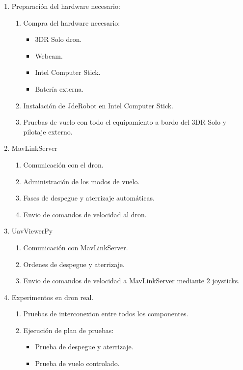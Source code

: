 \begin{enumerate}
\item Preparación del hardware necesario:
	\begin{enumerate}[label=\alph*]	
    \item Compra del hardware necesario:
    	\begin{itemize}
   	 	\item 3DR Solo dron.
    	\item Webcam.
    	\item Intel Computer Stick.
    	\item Batería externa.
    	\end{itemize}
    \item Instalación de JdeRobot en Intel Computer Stick.
    \item Pruebas de vuelo con todo el equipamiento a bordo del 3DR Solo y pilotaje externo.
	\end{enumerate}
\item MavLinkServer
	\begin{enumerate}[label=\alph*]	
    \item Comunicación con el dron.
    \item Administración de los modos de vuelo.
    \item Fases de despegue y aterrizaje automáticas.
    \item Envio de comandos de velocidad al dron.
	\end{enumerate}
\item UavViewerPy
	\begin{enumerate}[label=\alph*]	
    \item Comunicación con MavLinkServer.
    \item Ordenes de despegue y aterrizaje.
    \item Envio de comandos de velocidad a MavLinkServer mediante 2 joysticks.
	\end{enumerate}
\item Experimentos en dron real.
	\begin{enumerate}[label=\alph*]	
    \item Pruebas de interconexion entre todos los componentes.
    \item Ejecución de plan de pruebas:
	    \begin{itemize}
    	\item Prueba de despegue y aterrizaje.
    	\item Prueba de vuelo controlado.
    	\end{itemize}
	\end{enumerate}
\end{enumerate}

